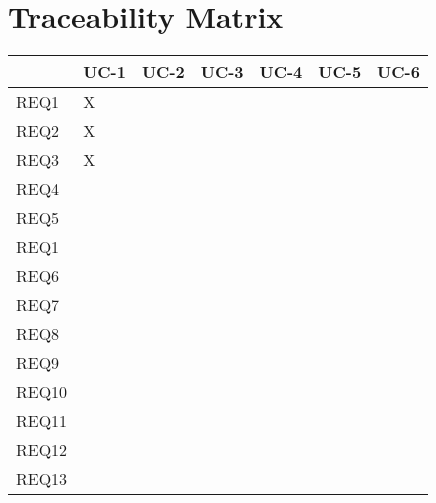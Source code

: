 \documentclass[11pt]{article}
\begin{document}
\newpage

\section{Traceability Matrix}

\begin{center}
\begin{tabular}{|l|l|l|l|l|l|l|}
\hline
& UC-1 & UC-2 & UC-3 & UC-4 & UC-5 & UC-6 \\ \hline
REQ1 & X &  &  &  &  &  \\ \hline
REQ2 & X &  &  &  &  &  \\ \hline
REQ3 & X &  &  &  &  &  \\ \hline
REQ4 &  &  &  &  &  &  \\ \hline
REQ5 &  &  &  &  &  &  \\ \hline
REQ1 &  &  &  &  &  &  \\  \hline
REQ6 &  &  &  &  &  &  \\ \hline
REQ7 &  &  &  &  &  &  \\ \hline
REQ8 &  &  &  &  &  &  \\ \hline
REQ9 &  &  &  &  &  &  \\ \hline
REQ10 &  &  &  &  &  &  \\ \hline
REQ11 &  &  &  &  &  &  \\ \hline
REQ12 &  &  &  &  &  &  \\ \hline
REQ13 &  &  &  &  &  & \\ \hline
\end{tabular}
\end{center}
\end{document}
